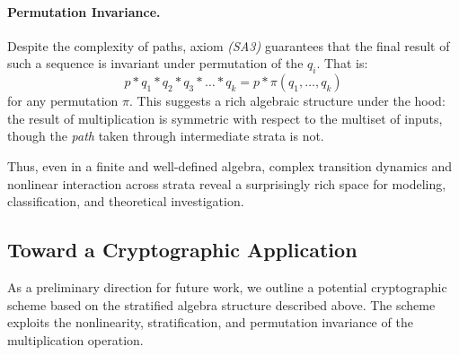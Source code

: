 \documentclass[12pt]{article}
\theoremstyle{definition}
\theoremstyle{plain}
\theoremstyle{remark}
\begin{document}
\paragraph{Permutation Invariance.} Despite the complexity of paths, axiom \emph{(SA3)} guarantees that the final result of such a sequence is invariant under permutation of the \( q_i \). That is:
\[
p * q_1 * q_2 * q_3 * \dots * q_k = p * \pi(q_1, \dots, q_k)
\]
for any permutation \( \pi \). This suggests a rich algebraic structure under the hood: the result of multiplication is symmetric with respect to the multiset of inputs, though the \emph{path} taken through intermediate strata is not.

Thus, even in a finite and well-defined algebra, complex transition dynamics and nonlinear interaction across strata reveal a surprisingly rich space for modeling, classification, and theoretical investigation.

\subsection{Toward a Cryptographic Application}

As a preliminary direction for future work, we outline a potential cryptographic scheme based on the stratified algebra structure described above. The scheme exploits the nonlinearity, stratification, and permutation invariance of the multiplication operation.
\end{document}
